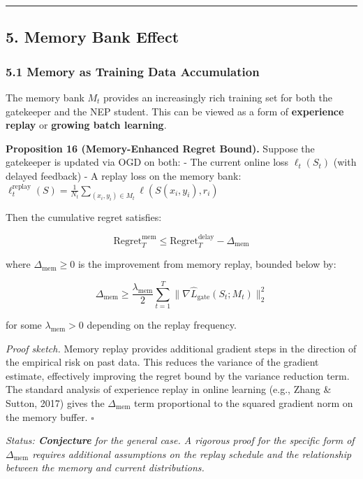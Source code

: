 \documentclass[
  12pt,
]{article}
\begin{document}
\begin{center}\rule{0.5\linewidth}{0.5pt}\end{center}

\subsection{5. Memory Bank Effect}\label{memory-bank-effect}

\subsubsection{5.1 Memory as Training Data
Accumulation}\label{memory-as-training-data-accumulation}

The memory bank \(M_t\) provides an increasingly rich training set for
both the gatekeeper and the NEP student. This can be viewed as a form of
\textbf{experience replay} or \textbf{growing batch learning}.

\textbf{Proposition 16 (Memory-Enhanced Regret Bound).} Suppose the
gatekeeper is updated via OGD on both: - The current online loss
\(\ell_t(S_t)\) (with delayed feedback) - A replay loss on the memory
bank:
\(\ell_t^{\text{replay}}(S) = \frac{1}{N_t} \sum_{(x_i,y_i) \in M_t} \ell(S(x_i, y_i), r_i)\)

Then the cumulative regret satisfies:

\[\boxed{\;\text{Regret}_T^{\text{mem}} \leq \text{Regret}_T^{\text{delay}} - \Delta_{\text{mem}}\;}\]

where \(\Delta_{\text{mem}} \geq 0\) is the improvement from memory
replay, bounded below by:

\[\Delta_{\text{mem}} \geq \frac{\lambda_{\text{mem}}}{2} \sum_{t=1}^T \bigl\| \nabla \hat{L}_{\text{gate}}(S_t; M_t) \bigr\|_2^2\]

for some \(\lambda_{\text{mem}} > 0\) depending on the replay frequency.

\emph{Proof sketch.} Memory replay provides additional gradient steps in
the direction of the empirical risk on past data. This reduces the
variance of the gradient estimate, effectively improving the regret
bound by the variance reduction term. The standard analysis of
experience replay in online learning (e.g., Zhang \& Sutton, 2017) gives
the \(\Delta_{\text{mem}}\) term proportional to the squared gradient
norm on the memory buffer. \(\square\)

\emph{Status: \textbf{Conjecture} for the general case. A rigorous proof
for the specific form of \(\Delta_{\text{mem}}\) requires additional
assumptions on the replay schedule and the relationship between the
memory and current distributions.}
\end{document}
